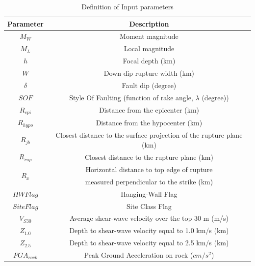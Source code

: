\begin{table}[!t]
\renewcommand{\arraystretch}{1.3}
\caption{Definition of Input parameters} \label{def} \centering
\begin{tabular}{|c|c|}
\hline Parameter& Description\\
\hline $M_W$ & {\small Moment magnitude}\\

\hline $M_L$ & {\small Local magnitude}\\

\hline $h$ & {\small Focal depth (km)}\\

\hline $W$ & {\small Down-dip rupture width (km)}\\

\hline $\delta$ & {\small Fault dip (degree)}\\

\hline $SOF$ & {\small Style Of Faulting (function of rake angle,
$\lambda$
(degree))}\\

\hline $R_{epi}$ & {\small Distance from the epicenter (km)}\\

\hline $R_{hypo}$ & {\small Distance from the hypocenter (km)}\\

\hline $R_{jb}$ & {\small Closest distance to the surface projection
of the
rupture plane (km)}\\

\hline $R_{rup}$ & {\small Closest distance to the rupture plane (km)}\\

\hline \multirow{2}{*}{$R_x$} & {\small Horizontal distance to top edge of rupture}\\
 &{\small measured
perpendicular to the strike (km)}\\

\hline $HW Flag$ & {\small Hanging-Wall Flag}\\

\hline $Site Flag$ & {\small Site Class Flag}\\

\hline $V_{S30}$ & {\small Average shear-wave velocity over the top 30 m (m/s)}\\

\hline $Z_{1.0}$ & {\small Depth to shear-wave velocity equal to 1.0
km/s
(km)}\\

\hline $Z_{2.5}$ & {\small Depth to shear-wave velocity equal to 2.5
km/s
(km)}\\

\hline $PGA_{rock}$ &{\small Peak Ground Acceleration on rock ($cm/s^2$)}\\
\hline

\end{tabular}
\end{table}






